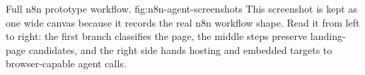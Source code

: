   {Full n8n prototype workflow.}
  {fig:n8n-agent-screenshots}
  {This screenshot is kept as one wide canvas because it records the real n8n workflow
  shape. Read it from left to right: the first branch classifies the page, the middle
  steps preserve landing-page candidates, and the right side hands hosting and embedded
  targets to browser-capable agent calls.}
